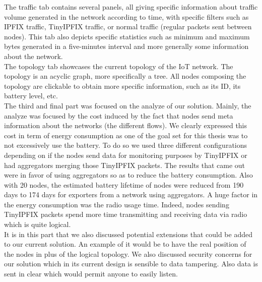 The traffic tab contains several panels, all giving specific information about traffic volume generated in the network according to time, with specific filters such as IPFIX traffic, TinyIPFIX traffic, or normal traffic (regular packets sent between nodes). This tab also depicts specific statistics such as minimum and maximum bytes generated in a five-minutes interval and more generally some information about the network. \\

The topology tab showcases the current topology of the IoT network. The topology is an acyclic graph, more specifically a tree. All nodes composing the topology are clickable to obtain more specific information, such as its ID, its battery level, etc.\\

The third and final part was focused on the analyze of our solution. Mainly, the analyze was focused by the cost induced by the fact that nodes send meta information about the networks (the different flows). We clearly expressed this cost in term of energy consumption as one of the goal set for this thesis was to not excessively use the battery. To do so we used three different configurations depending on if the nodes send data for monitoring purposes by TinyIPFIX or had aggregators merging those TinyIPFIX packets. The results that came out were in favor of using aggregators so as to reduce the battery consumption. Also with 20 nodes, the estimated battery lifetime of nodes were reduced from 190 days to 174 days for exporters from a network using aggregators. A huge factor in the energy consumption was the radio usage time. Indeed, nodes sending TinyIPFIX packets spend more time transmitting and receiving data via radio which is quite logical.\\

It is in this part that we also discussed potential extensions that could be added to our current solution. An example of it would be to have the real position of the nodes in plus of the logical topology. We also discussed security concerns for our solution which in its current design is sensible to data tampering. Also data is sent in clear which would permit anyone to easily listen.
